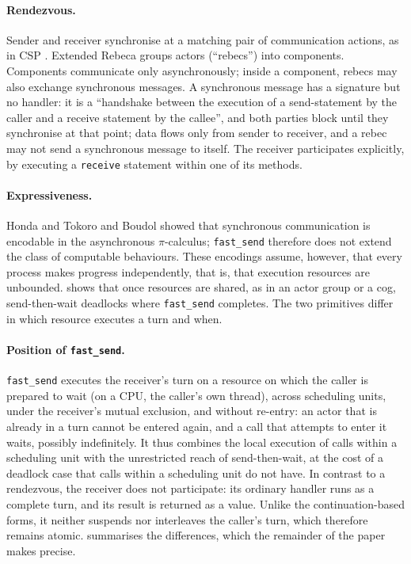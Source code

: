 \documentclass[11pt]{article}
\theoremstyle{definition}
\theoremstyle{remark}
\newcommand{\fs}{\texttt{fast\_send}}
\begin{document}
\paragraph{Rendezvous.} Sender and receiver synchronise at a matching pair of
communication actions, as in CSP \cite{hoare1978csp}. Extended Rebeca
\cite{sirjani2005jucs} groups actors (``rebecs'') into components. Components
communicate only asynchronously; inside a component, rebecs may also exchange
synchronous messages. A synchronous message has a signature but no handler: it is a
``handshake between the execution of a send-statement by the caller and a receive
statement by the callee'', and both parties block until they synchronise at that point;
data flows only from sender to receiver, and a rebec may not send a synchronous message
to itself. The receiver participates explicitly, by executing a \texttt{receive}
statement within one of its methods.

\paragraph{Expressiveness.} Honda and Tokoro \cite{hondatokoro1991} and Boudol
\cite{boudol1992} showed that synchronous communication is encodable in the asynchronous
$\pi$-calculus; \fs{} therefore does not extend the class of computable behaviours. These
encodings assume, however, that every process makes progress independently, that is,
that execution resources are unbounded.  shows that once resources
are shared, as in an actor group or a cog, send-then-wait deadlocks where \fs{}
completes. The two primitives differ in which resource executes a turn and when.

\paragraph{Position of \fs{}.} \fs{} executes the receiver's turn on a resource on which
the caller is prepared to wait (on a CPU, the caller's own thread), across scheduling
units, under the receiver's mutual exclusion, and without re-entry: an actor that is
already in a turn cannot be entered again, and a call that attempts to enter it waits,
possibly indefinitely. It thus combines the local execution of calls within a scheduling
unit with the unrestricted reach of send-then-wait, at the cost of a deadlock case that
calls within a scheduling unit do not have. In contrast to a rendezvous, the receiver
does not participate: its ordinary handler runs as a complete turn, and its result is
returned as a value. Unlike the continuation-based forms, it neither suspends nor
interleaves the caller's turn, which therefore remains atomic. 
summarises the differences, which the remainder of the paper makes precise.
\end{document}
